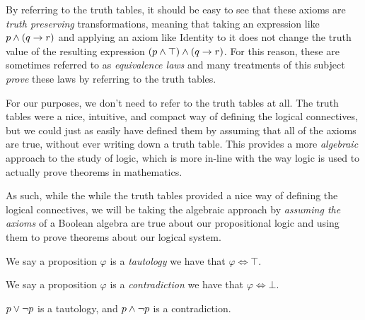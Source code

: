 \begin{definition}
    By referring to the truth tables,
    it should be easy to see that these axioms are \emph{truth preserving} transformations,
    meaning that taking an expression like $p \wedge (q \rightarrow r)$
    and applying an axiom like Identity to it
    does not change the truth value of the resulting expression $(p \wedge \top) \wedge (q \rightarrow r)$.
    For this reason, these are sometimes referred to as \emph{equivalence laws} and many treatments of this subject
    \emph{prove} these laws by referring to the truth tables.

    For our purposes, we don't need to refer to the truth tables at all.
    The truth tables were a nice, intuitive, and compact way of defining the logical connectives,
    but we could just as easily have defined them by assuming that all of the axioms are true,
    without ever writing down a truth table.
    This provides a more \emph{algebraic} approach to the study of logic,
    which is more in-line with the way logic is used to actually prove theorems in mathematics.

    As such, while the while the truth tables provided a nice way of defining the logical connectives,
    we will be taking the algebraic approach by \emph{assuming the axioms} of a Boolean algebra
    are true about our propositional logic
    and using them to prove theorems about our logical system.
\end{definition}

\begin{definition}[Tautology]
    We say a proposition $\varphi$ is a \emph{tautology}
    \iffbydefn we have that $\varphi \iff \top$.
\end{definition}
\begin{definition}[Contradiction]
    We say a proposition $\varphi$ is a \emph{contradiction}
    \iffbydefn we have that $\varphi \iff \bot$.
\end{definition}
\begin{example}
    $p \vee \neg p$ is a tautology, and $p \wedge \neg p$ is a contradiction.
\end{example}

\newpage

